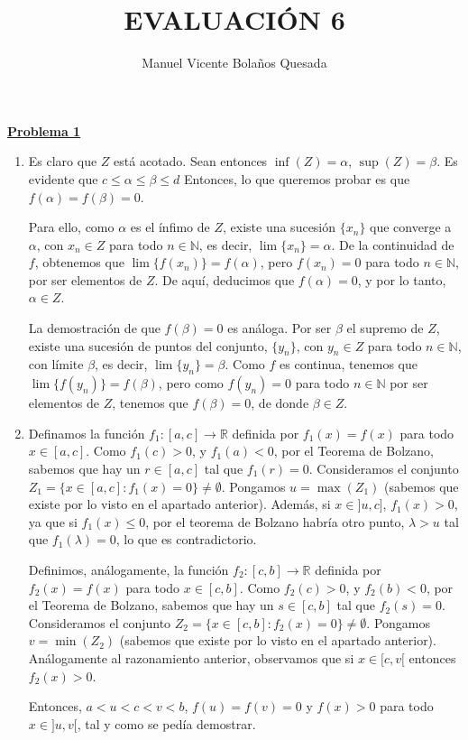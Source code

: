 \documentclass[10pt,a4paper]{article}
\begin{document}
	\title{EVALUACIÓN 6}
	\author{Manuel Vicente Bolaños Quesada}
	\date{}
	\maketitle
	
	
	\begin{flushleft}
		\textbf{\underline{Problema 1}}
	\end{flushleft}
	
	\begin{enumerate}[label = \alph*)]
		\item Es claro que $Z$ está acotado. Sean entonces $\inf (Z) = \alpha$, $\sup (Z) = \beta$. Es evidente que $c \leq \alpha \leq \beta \leq d$ Entonces, lo que queremos probar es que $f(\alpha) = f(\beta) = 0$.
		
		Para ello, como $\alpha$ es el ínfimo de $Z$, existe una sucesión $\{x_n\}$ que converge a $\alpha$, con $x_n \in Z$ para todo $n \in \mathbb{N}$, es decir, $\lim \{x_n\} = \alpha$. De la continuidad de $f$, obtenemos que $\lim \{f(x_n)\} = f(\alpha)$, pero $f(x_n) = 0$ para todo $n \in \mathbb{N}$, por ser elementos de $Z$. De aquí, deducimos que $f(\alpha) = 0$, y por lo tanto, $\alpha \in Z$.
		
		La demostración de que $f(\beta) = 0$ es análoga. Por ser $\beta$ el supremo de $Z$, existe una sucesión de puntos del conjunto, $\{y_n\}$, con $y_n \in Z$ para todo $n \in \mathbb{N}$, con límite $\beta$, es decir, $\lim \{y_n\} = \beta$. Como $f$ es continua, tenemos que $\lim\{f(y_n)\} = f(\beta)$, pero como $f(y_n) = 0$ para todo $n \in \mathbb{N}$ por ser elementos de $Z$, tenemos que $f(\beta) = 0$, de donde $\beta \in Z$.
		
		\item Definamos la función $f_1 : [a, c] \rightarrow \mathbb{R}$ definida por $f_1(x) = f(x)$ para todo $x \in [a, c]$. Como $f_1(c) > 0$, y $f_1 (a) < 0$, por el Teorema de Bolzano, sabemos que hay un $r \in [a, c]$ tal que $f_1(r) = 0$. Consideramos el conjunto $Z_1 = \{x \in [a, c] : f_1(x) = 0\} \neq \emptyset$. Pongamos $u = \max (Z_1)$ (sabemos que existe por lo visto en el apartado anterior). Además, si $x \in ]u, c]$, $f_1(x) > 0$, ya que si $f_1(x) \leq 0$, por el teorema de Bolzano habría otro punto, $\lambda > u$ tal que $f_1(\lambda) = 0$, lo que es contradictorio.
		
		Definimos, análogamente, la función $f_2 : [c, b] \rightarrow \mathbb{R}$ definida por $f_2(x) = f(x)$ para todo $x \in [c, b]$. Como $f_2(c) > 0$, y $f_2(b) < 0$, por el Teorema de Bolzano, sabemos que hay un $s \in [c, b]$ tal que $f_2(s) = 0$. Consideramos el conjunto $Z_2 = \{x \in [c, b] : f_2(x) = 0\} \neq \emptyset$. Pongamos $v = \min (Z_2)$ (sabemos que existe por lo visto en el apartado anterior). Análogamente al razonamiento anterior, observamos que si $x \in [c, v[$ entonces $f_2(x) > 0$.
		
		Entonces, $a < u < c < v < b$, $f(u) = f(v) = 0$ y $f(x) > 0$ para todo $x \in ]u, v[$, tal y como se pedía demostrar. \newline 
	\end{enumerate}
\end{document}
